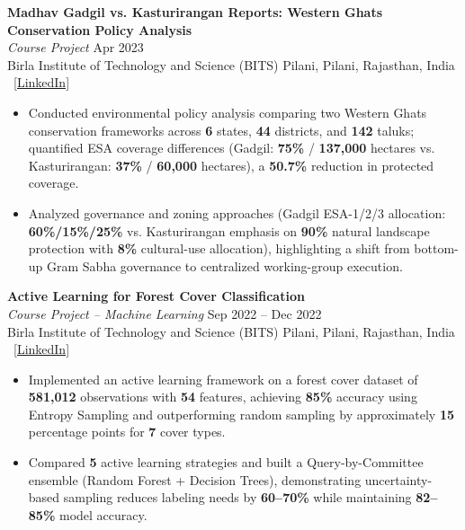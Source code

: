 \documentclass[11pt,letterpaper]{article}
\begin{document}
\vspace{6pt}
\textbf{Madhav Gadgil vs. Kasturirangan Reports: Western Ghats Conservation Policy Analysis}\\
\textit{Course Project} \hfill Apr 2023\\
Birla Institute of Technology and Science (BITS) Pilani, Pilani, Rajasthan, India \textbar\ \href{https://www.linkedin.com/in/namit-shrivastava-baab47204/details/projects/}{[LinkedIn]}
\begin{itemize}[leftmargin=16pt, noitemsep, topsep=2pt]
    \item Conducted environmental policy analysis comparing two Western Ghats conservation frameworks across \textbf{6} states, \textbf{44} districts, and \textbf{142} taluks; quantified ESA coverage differences (Gadgil: \textbf{75\%} / \textbf{137,000} hectares vs. Kasturirangan: \textbf{37\%} / \textbf{60,000} hectares), a \textbf{50.7\%} reduction in protected coverage.
    \item Analyzed governance and zoning approaches (Gadgil ESA-1/2/3 allocation: \textbf{60\%/15\%/25\%} vs. Kasturirangan emphasis on \textbf{90\%} natural landscape protection with \textbf{8\%} cultural-use allocation), highlighting a shift from bottom-up Gram Sabha governance to centralized working-group execution.
\end{itemize}

\vspace{6pt}
\textbf{Active Learning for Forest Cover Classification}\\
\textit{Course Project -- Machine Learning} \hfill Sep 2022 -- Dec 2022\\
Birla Institute of Technology and Science (BITS) Pilani, Pilani, Rajasthan, India \textbar\ \href{https://www.linkedin.com/in/namit-shrivastava-baab47204/details/projects/}{[LinkedIn]}
\begin{itemize}[leftmargin=16pt, noitemsep, topsep=2pt]
    \item Implemented an active learning framework on a forest cover dataset of \textbf{581,012} observations with \textbf{54} features, achieving \textbf{85\%} accuracy using Entropy Sampling and outperforming random sampling by approximately \textbf{15} percentage points for \textbf{7} cover types.
    \item Compared \textbf{5} active learning strategies and built a Query-by-Committee ensemble (Random Forest + Decision Trees), demonstrating uncertainty-based sampling reduces labeling needs by \textbf{60--70\%} while maintaining \textbf{82--85\%} model accuracy.
\end{itemize}
\end{document}
